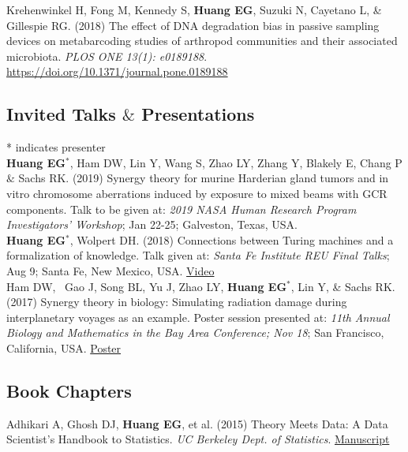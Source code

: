 \documentclass[10pt, letterpaper]{article}
\newcommand{\years}[1]{\marginnote{\scriptsize #1}}
\begin{document}
\years{2018}Krehenwinkel H, Fong M, Kennedy S, \textbf{Huang EG}, Suzuki N, Cayetano L, \& Gillespie RG. (2018) The effect of DNA degradation bias in passive sampling devices on metabarcoding studies of arthropod communities and their associated microbiota. \emph{PLOS ONE 13(1): e0189188}. \\
\href{https://doi.org/10.1371/journal.pone.0189188}{https://doi.org/10.1371/journal.pone.0189188} \\

\subsection*{Invited Talks $\&$ Presentations}
* indicates presenter\\

\noindent
\years{2019}\textbf{Huang EG}$^{*}$, Ham DW, Lin Y, Wang S, Zhao LY, Zhang Y, Blakely E, Chang P $\&$ Sachs RK. (2019) Synergy theory for murine Harderian gland tumors and in vitro chromosome aberrations induced by exposure to mixed beams with GCR components. Talk to be given at: \emph{2019 NASA Human Research Program Investigators' Workshop}; Jan 22-25; Galveston, Texas, USA.\\

\years{2018}\textbf{Huang EG}$^{*}$, Wolpert DH. (2018) Connections between Turing machines and a formalization of knowledge. Talk given at: \emph{Santa Fe Institute REU Final Talks}; Aug 9; Santa Fe, New Mexico, USA. \href{https://www.youtube.com/watch?v=10bi_R47uYw&list=PLZlVBTf7N6GpTwEeQOlOmIfYN5J7zciZR&index=6&t=0s}{Video}\\

\years{2017}Ham DW,  Gao J, Song BL, Yu J, Zhao LY, \textbf{Huang EG}$^{*}$, Lin Y, \& Sachs RK. (2017) Synergy theory in biology: Simulating radiation damage during interplanetary voyages as an example. Poster session presented at: \emph{11th Annual Biology and Mathematics in the Bay Area Conference; Nov 18}; San Francisco, California, USA. \href{https://github.com/sachsURAP/BaMBA_11/blob/master/Bamba17v3.pdf}{Poster}\\

\subsection*{Book Chapters}
\noindent
\years{2015}Adhikari A, Ghosh DJ, \textbf{Huang EG}, et al. (2015) Theory Meets Data: A Data Scientist’s Handbook to Statistics. \emph{UC Berkeley Dept. of Statistics}. {\href{https://github.com/eghuang/stat_94}{Manuscript}}\\
\end{document}
